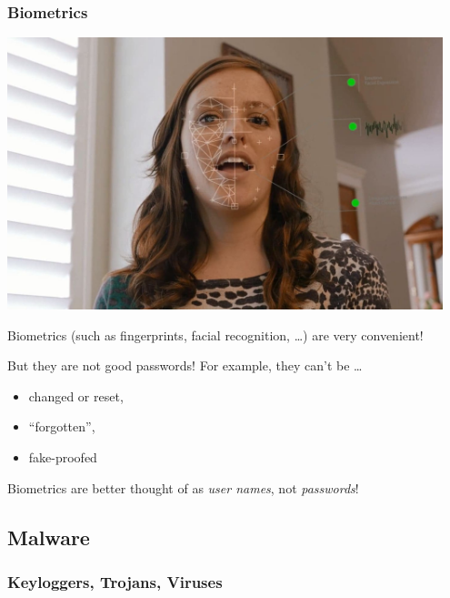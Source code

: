 \documentclass[aspectratio=169,dvipsnames]{beamer}
\begin{document}
\begin{frame}
\frametitle{Biometrics}

\begin{minipage}{0.5\textwidth}
\begin{center}
\includegraphics[width=0.95\textwidth, keepaspectratio]{images/hirevue.jpeg}
\end{center}
\end{minipage}\pause\quad
\begin{minipage}{0.45\textwidth}
Biometrics (such as fingerprints, facial recognition, \dots) are very convenient!
\pause\medskip

But they are not good passwords! For example, they can't be \dots

\begin{itemize}
\pause\item changed or reset,
\pause\item ``forgotten'',
\pause\item fake-proofed
\end{itemize}
\end{minipage}

\pause\bigskip
\begin{center}
\Large
Biometrics are better thought of as \emph{user names}, not \emph{passwords}!
\end{center}
\end{frame}

\subsection{Malware}

\subsubsection{Keyloggers, Trojans, Viruses}
\end{document}
